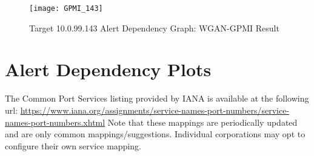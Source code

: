 \begin{appendices}
	\begin{figure}[!htbp]
		\centering
		\texttt{[image: GPMI\_143]}
		\caption{
			Target 10.0.99.143 Alert Dependency Graph: WGAN-GPMI Result 
		}
		\label{fig:alert_depend_8}
	\end{figure}

	\chapter{Alert Dependency Plots}
	\label{sec:iana_app}
	The Common Port Services listing provided by IANA is available at the following url:
	\href{https://www.iana.org/assignments/service-names-port-numbers/service-names-port-numbers.xhtml}{https://www.iana.org/assignments/service-names-port-numbers/service-names-port-numbers.xhtml}
	Note that these mappings are periodically updated and are only common mappings/suggestions. Individual corporations may opt to configure their own service mapping. 


\end{appendices}